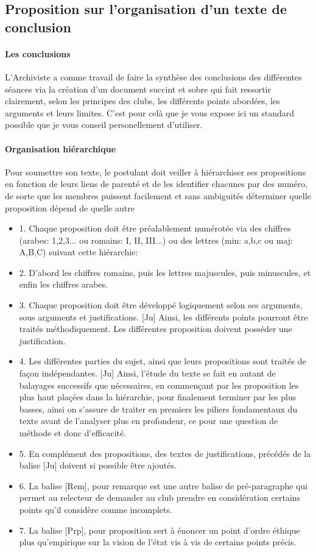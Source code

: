 \documentclass[a4paper,12pt]{article}
\begin{document}
\subsection{Proposition sur l'organisation d'un texte de conclusion}
\paragraph{Les conclusions}
L'Archiviste a comme travail de faire la synthèse des conclusions des différentes séances via la création d'un document succint et sobre qui fait ressortir clairement, selon les principes des clubs, les différents points abordées, les arguments et leurs limites. C'est pour celà que je vous expose ici un standard possible que je vous conseil personellement d'utiliser.
\paragraph{Organisation hiérarchique}
Pour soumettre son texte, le postulant doit veiller à hiérarchiser ses propositions en fonction de leurs liens de parenté et de les identifier chacunes par des numéro, de sorte que les membres puissent facilement et sans ambiguités déterminer quelle proposition dépend de quelle autre
\begin{itemize}
 \item 1. Chaque proposition doit être préalablement numérotée via des chiffres (arabes: 1,2,3... ou romains: I, II, III...) ou des lettres (min: a,b,c ou maj: A,B,C) suivant cette hiérarchie:
 \item 2. D'abord les chiffres romains, puis les lettres majuscules, puis minuscules, et enfin les chiffres arabes.
 \item 3. Chaque proposition doit être développé logiquement selon ses arguments, sous arguments et justifications. [Ju] Ainsi, les différents points pourront être traités méthodiquement. Les différentes proposition doivent posséder une justification. 
 \item 4. Les différentes parties du sujet, ainsi que leurs propositions sont traités de façon indépendantes. [Ju] Ainsi, l'étude du texte se fait en autant de balayages successifs que nécessaires, en commençant par les proposition les plus haut plaçées dans la hiérarchie, pour finalement terminer par les plus basses, ainsi on s'assure de traiter en premiers les piliers fondamentaux du texte avant de l'analyser plus en profondeur, ce pour une question de méthode et donc d'efficacité.
 \item 5. En complément des propositions, des textes de justifications, précédés de la balise [Ju] doivent si possible être ajoutés.
 \item 6. La balise [Rem], pour remarque est une autre balise de pré-paragraphe qui permet au relecteur de demander au club prendre en considération certains points qu'il considère comme incomplets.
 \item 7. La balise [Prp], pour proposition sert à énoncer un point d'ordre éthique plus qu'empirique sur la vision de l'état vis à vis de certains points précis.
\end{itemize}
\end{document}
